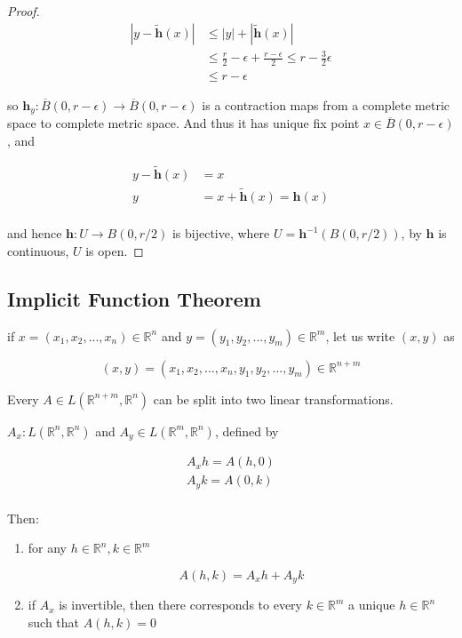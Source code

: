 \begin{proof}
    \begin{align*}
        \left| y - \tilde{\mathbf{h}}(x) \right| &\le |y| + \left| \tilde{\mathbf{h}}(x) \right| \\
        & \le \frac{r}{2} - \epsilon + \frac{r-\epsilon}{2} \le  r - \frac{3}{2}\epsilon \\
        & \le r - \epsilon
    \end{align*}

    so $\mathbf{h}_y: \overline{B}(0, r - \epsilon) \to \overline{B}(0, r - \epsilon)$ is a contraction maps from a complete 
    metric space to complete metric space. And thus it has unique fix point $x \in \overline{B}(0, r-\epsilon)$, and

    \begin{align*}
        y - \tilde{\mathbf{h}}(x) &= x \\
        y  &= x + \tilde{\mathbf{h}}(x) = \mathbf{h}(x)\\
    \end{align*}

    and hence $\mathbf{h}:U \to B(0, r/2)$ is bijective, where $U = \mathbf{h}^{-1}(B(0,r/2))$, by $\mathbf{h}$ is continuous,
    $U$ is open.
\end{proof}

\subsection{Implicit Function Theorem}

\begin{thm}
    if $x=(x_1,x_2,...,x_n) \in \mathbb{R}^n$ and $y=(y_1,y_2,...,y_m) \in \mathbb{R}^m$, let us
    write $(x,y)$ as

    \[
        (x,y) = (x_1,x_2,...,x_n,y_1,y_2,...,y_m) \in \mathbb{R}^{n + m}
    \]

    Every $A \in L(\mathbb{R}^{n+m}, \mathbb{R}^n)$ can be split into two linear transformations.

    $A_x: L(\mathbb{R}^n, \mathbb{R}^n)$ and $A_y \in L(\mathbb{R}^m, \mathbb{R}^n)$, defined by

    \begin{align*}
        A_xh = A(h,0) \\
        A_yk = A(0,k) \\
    \end{align*}

    Then:

    \begin{enumerate}
        \item for any $h \in \mathbb{R}^n, k \in \mathbb{R}^m$

        \[
            A(h,k) = A_xh + A_yk
        \]

        \item if $A_x$ is invertible, then there corresponds to every $k \in \mathbb{R}^m$ a unique $h \in \mathbb{R}^n$ such that
        $A(h,k) = 0$
    \end{enumerate}

\end{thm}

